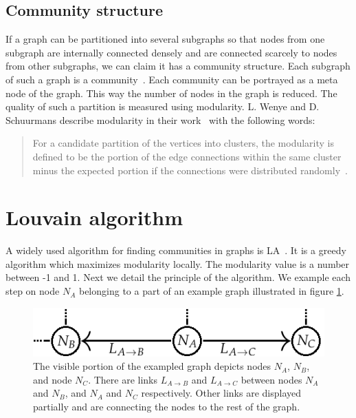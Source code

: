\subsection{Community structure} \label{communityStructure}
If a graph can be partitioned into several subgraphs so that nodes from one subgraph are internally connected densely and are connected scarcely to nodes from other subgraphs, we can claim it has a community structure. Each subgraph of such a graph is a community~\cite{communitiesOverview}. Each community can be portrayed as a meta node of the graph. This way the number of nodes in the graph is reduced. The quality of such a partition is measured using modularity. L. Wenye and D. Schuurmans describe modularity in their work~\cite{modularityOverview} with the following words: \begin{quotation}  For a candidate partition of the vertices into clusters, the modularity is defined to be the portion of the edge connections within the same cluster minus the expected portion if the connections were distributed randomly~\cite{modularityDefinition}. \end{quotation}

\section{Louvain algorithm} \label{louvainAlgorithm}
A widely used algorithm for finding communities in graphs is LA~\cite{louvainAlgorithm}. It is a greedy algorithm which maximizes modularity locally. The modularity value is a number between -1 and 1. Next we detail the principle of the algorithm. We example each step on node $N_{A}$ belonging to a part of an example graph illustrated in figure \ref{exampleGraphLouvain}.
\begin{figure}[ht!]
  \centering
  \includegraphics[width=\textwidth]{Images/graphForCommunity.png}
  \caption{The visible portion of the exampled graph depicts nodes $N_{A}$, $N_{B}$, and  node $N_{C}$. There are links  $L_{A\rightarrow B}$ and  $L_{A\rightarrow C}$  between nodes  $N_{A}$ and  $N_{B}$, and  $N_{A}$ and  $N_{C}$ respectively. Other links are displayed partially and are connecting the nodes to the rest of the graph.}
  \label{exampleGraphLouvain}
\end{figure} 

